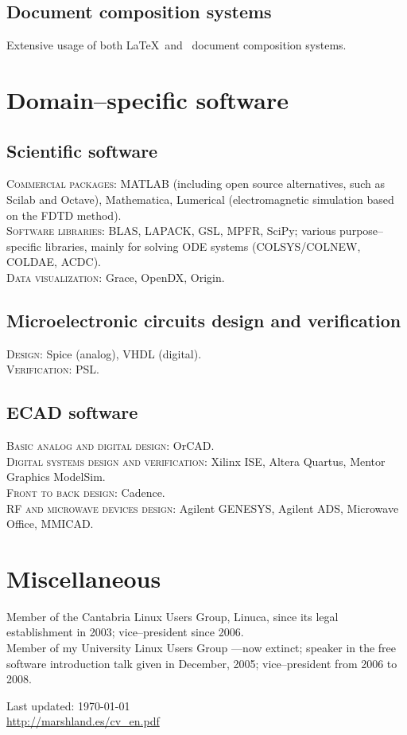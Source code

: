 \documentclass[11pt, a4paper]{article}
\begin{document}
\subsection*{Document composition systems}
\noindent
	Extensive usage of both \LaTeX\ and \XeTeX\ document composition systems.


\section*{Domain--specific software} %
\subsection*{Scientific software}
\noindent
	\textsc{Commercial packages}: MATLAB (including open source alternatives, such as Scilab and Octave), Mathematica, Lumerical (electromagnetic simulation based on the FDTD method).\\
	\textsc{Software libraries}: BLAS, LAPACK, GSL, MPFR, SciPy; various purpose--specific libraries, mainly for solving ODE systems (COLSYS/COLNEW, COLDAE, ACDC).\\
	\textsc{Data visualization}: Grace, OpenDX, Origin.
\subsection*{Microelectronic circuits design and verification}
\noindent
	\textsc{Design}: Spice (analog), VHDL (digital).\\
	\textsc{Verification}: PSL.
\subsection*{ECAD software}
\noindent
	\textsc{Basic analog and digital design}: OrCAD.\\
	\textsc{Digital systems design and verification}: Xilinx ISE, Altera Quartus, Mentor Graphics ModelSim.\\
	\textsc{Front to back design}: Cadence.\\
	\textsc{RF and microwave devices design}: Agilent GENESYS, Agilent ADS, Microwave Office, MMICAD.



\section*{Miscellaneous} %
\noindent
Member of the Cantabria Linux Users Group, Linuca, since its legal establishment in 2003; vice--president since 2006.\\
Member of my University Linux Users Group ---now extinct; speaker in the free software introduction talk given in December, 2005; vice--president from 2006 to 2008.


\vfill{}
\hrulefill


\begin{center}
{\scriptsize
	Last updated: \today \\
	\href{http://marshland.es/cv_en.pdf}
	     {http://marshland.es/cv\_en.pdf}
}
\end{center}
\end{document}
